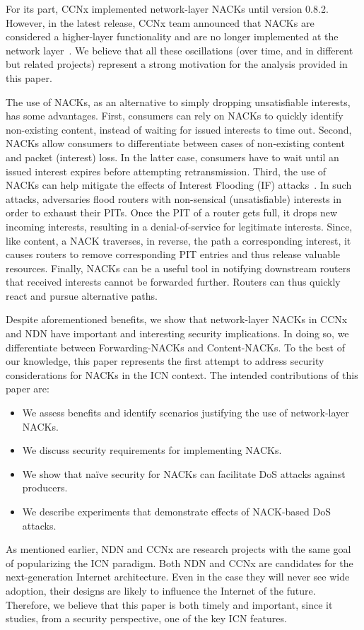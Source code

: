 \documentclass[conference]{IEEEtran}
\begin{document}
For its part, CCNx implemented network-layer NACKs until version 0.8.2. However, in 
the latest release, CCNx team announced that NACKs are considered a higher-layer functionality and 
are no longer implemented at the network layer~\cite{mosko2015ccnx}. We believe that all these oscillations 
(over time, and in different but related projects) represent a strong motivation for the analysis provided 
in this paper.

The use of NACKs, as an alternative to simply dropping unsatisfiable interests, has some advantages. 
First, consumers can rely on NACKs to quickly identify non-existing content, instead of waiting for issued
interests to time out. Second, NACKs allow consumers to differentiate between cases of non-existing content 
and packet (interest) loss. 
In the latter case, consumers have to wait until an issued interest expires before attempting 
retransmission. Third, the use of NACKs can help mitigate the effects of Interest Flooding (IF) attacks~\cite{gasti2013and}. 
In such attacks, adversaries flood routers with non-sensical (unsatisfiable) interests in order to exhaust 
their PITs. Once the PIT of a router gets full, it drops new incoming interests, resulting in a denial-of-service
for legitimate interests. Since, like content, a NACK traverses, in reverse, the path a corresponding interest, 
it causes routers to remove corresponding PIT entries and thus release valuable resources. Finally, NACKs 
can be a useful tool in notifying downstream routers that received interests cannot be forwarded further. 
Routers can thus quickly react and pursue alternative paths.

Despite aforementioned benefits, we show that network-layer NACKs in CCNx and NDN
have important and interesting security implications. In doing so, we differentiate between 
Forwarding-NACKs and Content-NACKs.
To the best of our knowledge, this paper represents the first attempt to  address security considerations 
for NACKs in the ICN context. The intended contributions of this paper are:
\begin{itemize}
	\item We assess benefits and identify scenarios justifying the use of network-layer NACKs.
	\item We discuss security requirements for implementing NACKs.
	\item We show that na\"ive security for NACKs can facilitate DoS attacks against producers. 
	\item We describe experiments that demonstrate effects of NACK-based DoS attacks.
\end{itemize}
As mentioned earlier, NDN and CCNx are research projects with the same goal of popularizing the ICN paradigm. 
Both NDN and CCNx are candidates for the next-generation Internet architecture. Even in the case they will never see wide adoption, 
their designs are likely to influence the Internet of the future. Therefore, we believe that this paper is 
both timely and important, since it studies, from a security  perspective, one of the key ICN features.
\end{document}
